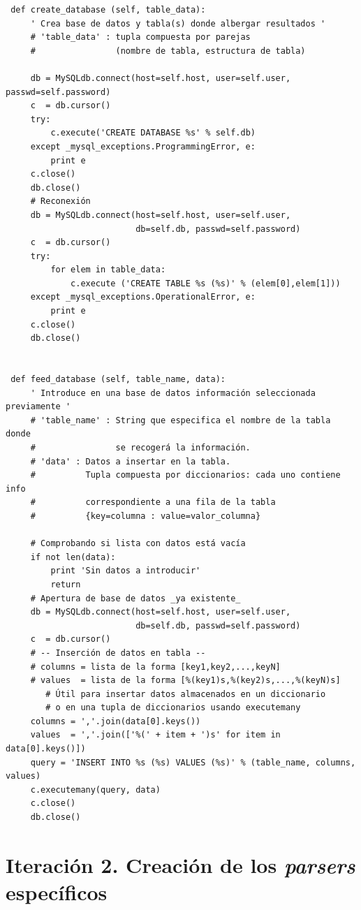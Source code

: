 {\scriptsize
\begin{verbatim}
 def create_database (self, table_data):
     ' Crea base de datos y tabla(s) donde albergar resultados '
     # 'table_data' : tupla compuesta por parejas
     #                (nombre de tabla, estructura de tabla)
     
     db = MySQLdb.connect(host=self.host, user=self.user, passwd=self.password)
     c  = db.cursor()
     try:
         c.execute('CREATE DATABASE %s' % self.db)
     except _mysql_exceptions.ProgrammingError, e:
         print e
     c.close()
     db.close()
     # Reconexión
     db = MySQLdb.connect(host=self.host, user=self.user,
                          db=self.db, passwd=self.password)
     c  = db.cursor()
     try:
         for elem in table_data:
             c.execute ('CREATE TABLE %s (%s)' % (elem[0],elem[1]))
     except _mysql_exceptions.OperationalError, e:
         print e
     c.close()
     db.close()
     
     
 def feed_database (self, table_name, data):
     ' Introduce en una base de datos información seleccionada previamente '
     # 'table_name' : String que especifica el nombre de la tabla donde
     #                se recogerá la información.
     # 'data' : Datos a insertar en la tabla.
     #          Tupla compuesta por diccionarios: cada uno contiene info
     #          correspondiente a una fila de la tabla
     #          {key=columna : value=valor_columna}
     
     # Comprobando si lista con datos está vacía
     if not len(data):
         print 'Sin datos a introducir'
         return
     # Apertura de base de datos _ya existente_
     db = MySQLdb.connect(host=self.host, user=self.user,
                          db=self.db, passwd=self.password)
     c  = db.cursor()
     # -- Inserción de datos en tabla --
     # columns = lista de la forma [key1,key2,...,keyN]
     # values  = lista de la forma [%(key1)s,%(key2)s,...,%(keyN)s]
        # Útil para insertar datos almacenados en un diccionario
        # o en una tupla de diccionarios usando executemany
     columns = ','.join(data[0].keys())
     values  = ','.join(['%(' + item + ')s' for item in data[0].keys()])
     query = 'INSERT INTO %s (%s) VALUES (%s)' % (table_name, columns, values)
     c.executemany(query, data)
     c.close()
     db.close()
\end{verbatim}
}



\section{Iteración 2. Creación de los \textit{parsers} específicos}


